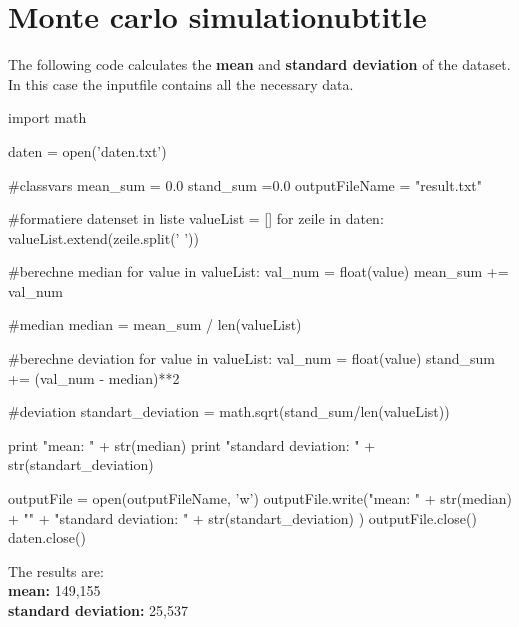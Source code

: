 \section{Monte carlo simulationubtitle}
The following code calculates the \textbf{mean}  and \textbf{standard deviation} of the dataset. 
In this case the inputfile contains all the necessary data.

\begin{python}[caption={Python code for median and standard deviation}]
import math

daten = open('daten.txt')  

#classvars
mean_sum = 0.0 
stand_sum =0.0
outputFileName = "result.txt"

#formatiere datenset in liste
valueList = []
for zeile in daten:
    valueList.extend(zeile.split(' '))

#berechne median
for value in  valueList:
    val_num = float(value)   
    mean_sum += val_num
    
#median
median = mean_sum / len(valueList)

#berechne deviation
for value in  valueList:
    val_num = float(value)
    stand_sum += (val_num - median)**2
    
#deviation
standart_deviation = math.sqrt(stand_sum/len(valueList))
    
print "mean:               " + str(median)
print "standard deviation: " + str(standart_deviation)

outputFile = open(outputFileName, 'w')
outputFile.write("mean:               " + str(median) + "\n" + "standard deviation: " + str(standart_deviation) )
outputFile.close()
daten.close()
\end{python}
The results are:\\
\textbf{mean:				}   149,155 \\        
\textbf {standard deviation:} 	25,537